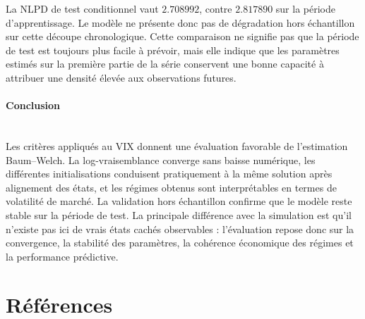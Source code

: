 \documentclass[11pt]{article}
\begin{document}
La NLPD de test conditionnel vaut \(2.708992\), contre \(2.817890\) sur la période d'apprentissage. Le modèle ne présente donc pas de dégradation hors échantillon sur cette découpe chronologique. Cette comparaison ne signifie pas que la période de test est toujours plus facile à prévoir, mais elle indique que les paramètres estimés sur la première partie de la série conservent une bonne capacité à attribuer une densité élevée aux observations futures.

\paragraph{Conclusion}\mbox{}\\

Les critères appliqués au VIX donnent une évaluation favorable de l'estimation Baum--Welch. La log-vraisemblance converge sans baisse numérique, les différentes initialisations conduisent pratiquement à la même solution après alignement des états, et les régimes obtenus sont interprétables en termes de volatilité de marché. La validation hors échantillon confirme que le modèle reste stable sur la période de test. La principale différence avec la simulation est qu'il n'existe pas ici de vrais états cachés observables : l'évaluation repose donc sur la convergence, la stabilité des paramètres, la cohérence économique des régimes et la performance prédictive.

\section{Références}
\end{document}
